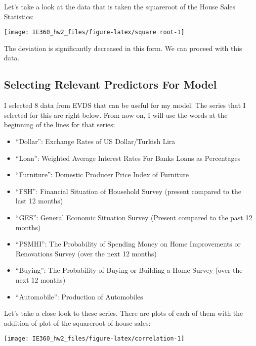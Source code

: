 \documentclass[
]{article}
\providecommand{\tightlist}{%
  \setlength{\itemsep}{0pt}\setlength{\parskip}{0pt}}
\begin{document}
Let's take a look at the data that is taken the squareroot of the House
Sales Statistics:

\begin{center}\texttt{[image: IE360\_hw2\_files/figure-latex/square root-1]} \end{center}

The deviation is significantly decreased in this form. We can proceed
with this data.

\hypertarget{selecting-relevant-predictors-for-model}{%
\subsection{Selecting Relevant Predictors For
Model}\label{selecting-relevant-predictors-for-model}}

I selected 8 data from EVDS that can be useful for my model. The series
that I selected for this are right below. From now on, I will use the
words at the beginning of the lines for that series:

\begin{itemize}
\tightlist
\item
  ``Dollar'': Exchange Rates of US Dollar/Turkish Lira
\item
  ``Loan'': Weighted Average Interest Rates For Banks Loans as
  Percentages
\item
  ``Furniture'': Domestic Producer Price Index of Furniture
\item
  ``FSH'': Financial Situation of Household Survey (present compared to
  the last 12 months)
\item
  ``GES'': General Economic Situation Survey (Present compared to the
  past 12 months)
\item
  ``PSMHI'': The Probability of Spending Money on Home Improvements or
  Renovations Survey (over the next 12 months)
\item
  ``Buying'': The Probability of Buying or Building a Home Survey (over
  the next 12 months)
\item
  ``Automobile'': Production of Automobiles
\end{itemize}

Let's take a close look to these series. There are plots of each of them
with the addition of plot of the squareroot of house sales:

\begin{center}\texttt{[image: IE360\_hw2\_files/figure-latex/correlation-1]} \end{center}
\end{document}
